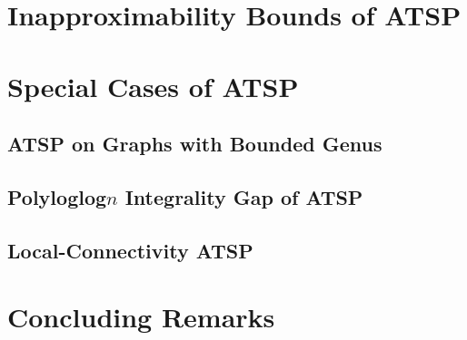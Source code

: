 \documentclass[oneside]{projectpaper} %
\begin{document}
\section{Inapproximability Bounds of ATSP}

\section{Special Cases of ATSP}

\subsection{ATSP on Graphs with Bounded Genus}

\subsection{Polyloglog$n$ Integrality Gap of ATSP}

\subsection{Local-Connectivity ATSP}

\section{Concluding Remarks}


\nocite{*}


\end{document}
